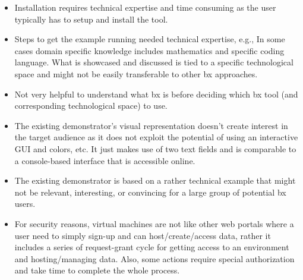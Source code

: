 \begin{itemize}
    \item {Installation requires technical expertise and time consuming as the user typically has to setup and install the tool.}

	\item {Steps to get the example running needed technical expertise, e.g., In some cases domain specific knowledge includes mathematics and specific coding language. What is showcased and discussed is tied to a specific technological space and might not be easily transferable to other bx approaches.}
	
	\item {Not very helpful to understand what bx is before deciding which bx tool (and corresponding technological space) to use.}
	
	\item {The existing demonstrator's visual representation doesn't create interest in the target audience as it does not exploit the potential of using an interactive GUI and colors, etc. It just makes use of two text fields and is comparable to a console-based interface that is accessible online.}
	
	\item {The existing demonstrator is based on a rather technical example that might not be relevant, interesting, or convincing for a large group of potential bx users.}	
	
	\item {For security reasons, virtual machines are not like other web portals where a user need to simply sign-up and can host/create/access data, rather it includes a series of request-grant cycle for getting access to an environment and hosting/managing data. Also, some actions require special authorization and take time to complete the whole process.}

\end{itemize}
